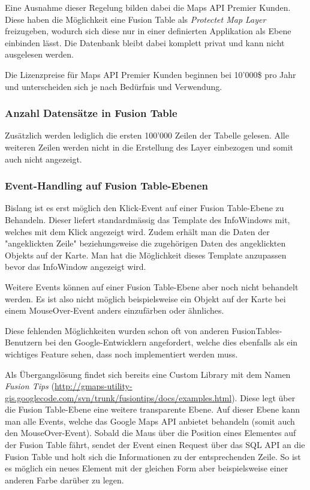 Eine Ausnahme dieser Regelung bilden dabei die Maps API Premier Kunden. Diese haben die Möglichkeit eine Fusion Table als \emph{Protectet Map Layer} freizugeben, wodurch sich diese nur in einer definierten Applikation als Ebene einbinden lässt. Die Datenbank bleibt dabei komplett privat und kann nicht ausgelesen werden.

Die Lizenzpreise für Maps API Premier Kunden beginnen bei 10'000\$ pro Jahr und unterscheiden sich je nach Bedürfnis und Verwendung. 

\subsubsection{Anzahl Datensätze in Fusion Table}
Zusätzlich werden lediglich die ersten 100'000 Zeilen der Tabelle gelesen. Alle weiteren Zeilen werden nicht in die Erstellung des Layer einbezogen und somit auch nicht angezeigt.

\subsubsection{Event-Handling auf Fusion Table-Ebenen}
Bislang ist es erst möglich den Klick-Event auf einer Fusion Table-Ebene zu Behandeln. Dieser liefert standardmässig das Template des InfoWindows mit, welches mit dem Klick angezeigt wird. Zudem erhält man die Daten der "angeklickten Zeile" beziehungsweise die zugehörigen Daten des angeklickten Objekts auf der Karte. Man hat die Möglichkeit dieses Template anzupassen bevor das InfoWindow angezeigt wird.

Weitere Events können auf einer Fusion Table-Ebene aber noch nicht behandelt werden. Es ist also nicht möglich beispielsweise ein Objekt auf der Karte bei einem MouseOver-Event anders einzufärben oder ähnliches.

Diese fehlenden Möglichkeiten wurden schon oft von anderen FusionTables-Benutzern bei den Google-Entwicklern angefordert, welche dies ebenfalls als ein wichtiges Feature sehen, dass noch implementiert werden muss.

Als Übergangslösung findet sich bereits eine Custom Library mit dem Namen \emph{Fusion Tips} (\url{http://gmaps-utility-gis.googlecode.com/svn/trunk/fusiontips/docs/examples.html}). Diese legt über die Fusion Table-Ebene eine weitere transparente Ebene. Auf dieser Ebene kann man alle Events, welche das Google Maps API anbietet behandeln (somit auch den MouseOver-Event). Sobald die Maus über die Position eines Elementes auf der Fusion Table fährt, sendet der Event einen Request über das SQL API an die Fusion Table und holt sich die Informationen zu der entsprechenden Zeile. So ist es möglich ein neues Element mit der gleichen Form aber beispielsweise einer anderen Farbe darüber zu legen.

